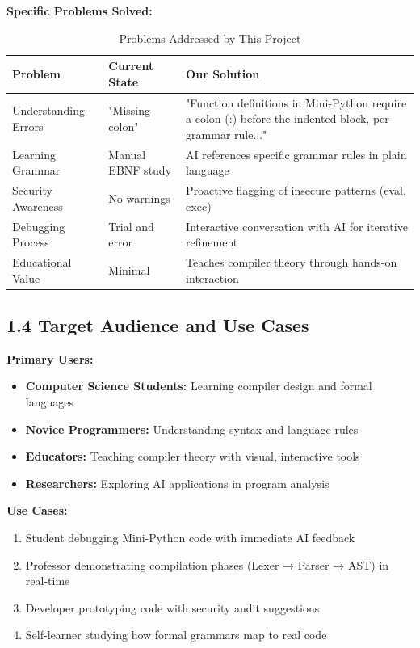 \documentclass[a4paper,11pt]{article}
\begin{document}
\textbf{Specific Problems Solved:}

\begin{table}[H]
\centering
\begin{tabularx}{\textwidth}{|l|X|X|}
\hline
\rowcolor{blue!10}
\textbf{Problem} & \textbf{Current State} & \textbf{Our Solution} \\
\hline
Understanding Errors & "Missing colon" & "Function definitions in Mini-Python require a colon (:) before the indented block, per grammar rule..." \\
\hline
Learning Grammar & Manual EBNF study & AI references specific grammar rules in plain language \\
\hline
Security Awareness & No warnings & Proactive flagging of insecure patterns (eval, exec) \\
\hline
Debugging Process & Trial and error & Interactive conversation with AI for iterative refinement \\
\hline
Educational Value & Minimal & Teaches compiler theory through hands-on interaction \\
\hline
\end{tabularx}
\caption{Problems Addressed by This Project}
\end{table}

\subsection{1.4 Target Audience and Use Cases}

\textbf{Primary Users:}
\begin{itemize}
    \item \textbf{Computer Science Students:} Learning compiler design and formal languages
    \item \textbf{Novice Programmers:} Understanding syntax and language rules
    \item \textbf{Educators:} Teaching compiler theory with visual, interactive tools
    \item \textbf{Researchers:} Exploring AI applications in program analysis
\end{itemize}

\textbf{Use Cases:}
\begin{enumerate}
    \item Student debugging Mini-Python code with immediate AI feedback
    \item Professor demonstrating compilation phases (Lexer → Parser → AST) in real-time
    \item Developer prototyping code with security audit suggestions
    \item Self-learner studying how formal grammars map to real code
\end{enumerate}
\end{document}
